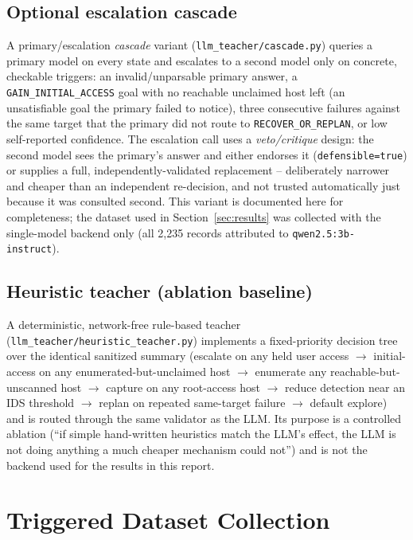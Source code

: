 \documentclass[11pt]{article}
\newcommand{\code}[1]{\texttt{#1}}
\begin{document}
\subsection{Optional escalation cascade}
A primary/escalation \emph{cascade} variant (\code{llm\_teacher/cascade.py}) queries
a primary model on every state and escalates to a second model only on concrete,
checkable triggers: an invalid/unparsable primary answer, a
\code{GAIN\_INITIAL\_ACCESS} goal with no reachable unclaimed host left (an
unsatisfiable goal the primary failed to notice), three consecutive failures against
the same target that the primary did not route to \code{RECOVER\_OR\_REPLAN}, or
low self-reported confidence. The escalation call uses a \emph{veto/critique} design:
the second model sees the primary's answer and either endorses it
(\code{defensible=true}) or supplies a full, independently-validated replacement --
deliberately narrower and cheaper than an independent re-decision, and not trusted
automatically just because it was consulted second. This variant is documented here
for completeness; the dataset used in Section~\ref{sec:results} was collected with
the single-model backend only (all 2{,}235 records attributed to
\code{qwen2.5:3b-instruct}).

\subsection{Heuristic teacher (ablation baseline)}
A deterministic, network-free rule-based teacher
(\code{llm\_teacher/heuristic\_teacher.py}) implements a fixed-priority decision tree
over the identical sanitized summary (escalate on any held user access
$\to$ initial-access on any enumerated-but-unclaimed host $\to$ enumerate any
reachable-but-unscanned host $\to$ capture on any root-access host $\to$ reduce
detection near an IDS threshold $\to$ replan on repeated same-target failure
$\to$ default explore) and is routed through the same validator as the LLM. Its
purpose is a controlled ablation (``if simple hand-written heuristics match the LLM's
effect, the LLM is not doing anything a much cheaper mechanism could not'') and is
not the backend used for the results in this report.

\section{Triggered Dataset Collection}
\label{sec:collection}
\end{document}
